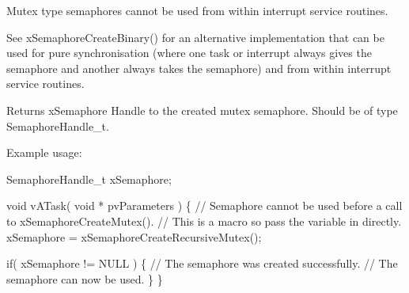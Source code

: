 Mutex type semaphores cannot be used from within interrupt service routines.

See x\+Semaphore\+Create\+Binary() for an alternative implementation that can be used for pure synchronisation (where one task or interrupt always \textquotesingle{}gives\textquotesingle{} the semaphore and another always \textquotesingle{}takes\textquotesingle{} the semaphore) and from within interrupt service routines.

\begin{DoxyReturn}{Returns}
x\+Semaphore Handle to the created mutex semaphore. Should be of type Semaphore\+Handle\+\_\+t.
\end{DoxyReturn}
Example usage\+: 
\begin{DoxyPre}
SemaphoreHandle\_t xSemaphore;\end{DoxyPre}



\begin{DoxyPre}void vATask( void * pvParameters )
\{
   // Semaphore cannot be used before a call to xSemaphoreCreateMutex().
   // This is a macro so pass the variable in directly.
   xSemaphore = xSemaphoreCreateRecursiveMutex();\end{DoxyPre}



\begin{DoxyPre}   if( xSemaphore != NULL )
   \{
       // The semaphore was created successfully.
       // The semaphore can now be used.
   \}
\}
\end{DoxyPre}
 